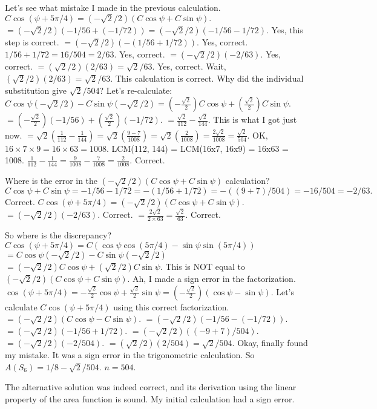 Let's see what mistake I made in the previous calculation. 
$C \cos(\psi+5\pi/4) = (-\sqrt{2}/2) (C \cos\psi + C \sin\psi).$ 
$= (-\sqrt{2}/2) (-1/56 + (-1/72)) = (-\sqrt{2}/2) (-1/56 - 1/72).$ Yes, this step is correct. 
$= (-\sqrt{2}/2) (-(1/56 + 1/72)).$ Yes, correct. 
$1/56 + 1/72 = 16/504 = 2/63.$ Yes, correct. 
$= (-\sqrt{2}/2) (-2/63).$ Yes, correct. 
$= (\sqrt{2}/2) (2/63) = \sqrt{2}/63.$ Yes, correct. 
Wait, $(\sqrt{2}/2) (2/63) = \sqrt{2}/63.$ This calculation is correct. Why did the individual substitution give $\sqrt{2}/504$? 
Let's re-calculate: 
$C\cos\psi (-\sqrt{2}/2) - C\sin\psi (-\sqrt{2}/2) = (-\frac{\sqrt{2}}{2}) C\cos\psi + (\frac{\sqrt{2}}{2}) C\sin\psi.$ 
$= (-\frac{\sqrt{2}}{2}) (-1/56) + (\frac{\sqrt{2}}{2}) (-1/72).$ 
$= \frac{\sqrt{2}}{112} - \frac{\sqrt{2}}{144}.$ This is what I got just now. 
$= \sqrt{2}(\frac{1}{112} - \frac{1}{144}) = \sqrt{2}(\frac{9-7}{1008}) = \sqrt{2}(\frac{2}{1008}) = \frac{2\sqrt{2}}{1008} = \frac{\sqrt{2}}{504}.$ 
OK, $16 \times 7 \times 9 = 16 \times 63 = 1008.$ LCM(112, 144) = LCM(16x7, 16x9) = 16x63 = 1008. 
$\frac{1}{112} - \frac{1}{144} = \frac{9}{1008} - \frac{7}{1008} = \frac{2}{1008}.$ Correct.

Where is the error in the $(-\sqrt{2}/2) (C \cos\psi + C \sin\psi)$ calculation? 
$C \cos\psi + C \sin\psi = -1/56 - 1/72 = -(1/56+1/72) = -( (9+7)/504 ) = -16/504 = -2/63.$ Correct. 
$C \cos(\psi+5\pi/4) = (-\sqrt{2}/2) (C \cos\psi + C \sin\psi).$ 
$= (-\sqrt{2}/2) (-2/63).$ Correct. 
$= \frac{2\sqrt{2}}{2 \times 63} = \frac{\sqrt{2}}{63}.$ Correct.

So where is the discrepancy? 
$C \cos(\psi+5\pi/4) = C(\cos\psi \cos(5\pi/4) - \sin\psi \sin(5\pi/4))$ 
$= C\cos\psi (-\sqrt{2}/2) - C\sin\psi (-\sqrt{2}/2)$ 
$= (-\sqrt{2}/2) C\cos\psi + (\sqrt{2}/2) C\sin\psi.$ 
This is NOT equal to $(-\sqrt{2}/2) (C \cos\psi + C \sin\psi).$ 
Ah, I made a sign error in the factorization. 
$\cos(\psi+5\pi/4) = -\frac{\sqrt{2}}{2}\cos\psi + \frac{\sqrt{2}}{2}\sin\psi = (-\frac{\sqrt{2}}{2}) (\cos\psi - \sin\psi).$ 
Let's calculate $C \cos(\psi+5\pi/4)$ using this correct factorization. 
$= (-\sqrt{2}/2) (C\cos\psi - C\sin\psi).$ 
$= (-\sqrt{2}/2) (-1/56 - (-1/72)).$ 
$= (-\sqrt{2}/2) (-1/56 + 1/72).$ 
$= (-\sqrt{2}/2) ((-9+7)/504).$ 
$= (-\sqrt{2}/2) (-2/504).$ 
$= (\sqrt{2}/2) (2/504) = \sqrt{2}/504.$ 
Okay, finally found my mistake. It was a sign error in the trigonometric calculation. 
So $A(S_6) = 1/8 - \sqrt{2}/504.$ 
$n=504.$

The alternative solution was indeed correct, and its derivation using the linear property of the area function is sound. My initial calculation had a sign error.